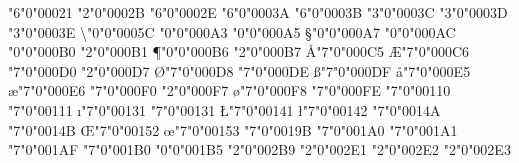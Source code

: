 \ifdefined\Umathchardef
  \let\mchardef\Umathchardef
  \let\delim\Udelimiter
  \let\maccent\Umathaccent
  \let\mcode\Umathcode
  \let\delimcode\Udelcode
  \let\mradical\Uradical
\else
  \let\mchardef\XeTeXmathchardef
  \let\delim\XeTeXdelimiter
  \let\maccent\XeTeXmathaccent
  \let\mcode\XeTeXmathcode
  \let\delimcode\XeTeXdelcode
  \let\mradical\XeTeXradical
\fi

\mchardef\exclam"6"0"00021
\def\lparen{\delim"4"0"00028 }
\def\rparen{\delim"5"0"00029 }
\mchardef\plus"2"0"0002B
\mchardef\ldotp"6"0"0002E
\mchardef\colon"6"0"0003A
\mchardef\semicolon"6"0"0003B
\mchardef\less"3"0"0003C
\mchardef\equal"3"0"0003D
\mchardef\greater"3"0"0003E
\def\lbrack{\delim"4"0"0005B }
\mchardef\backslash"0"0"0005C
\def\rbrack{\delim"5"0"0005D }
\def\lbrace{\delim"4"0"0007B }
\def\vert{\delim"0"0"0007C }
\def\rbrace{\delim"5"0"0007D }
\mchardef\sterling"0"0"000A3
\mchardef\yen"0"0"000A5
\mchardef\S"0"0"000A7
\def\guillemotleft{\delim"4"0"000AB }
\mchardef\neg"0"0"000AC
\mchardef\degree"0"0"000B0
\mchardef\pm"2"0"000B1
\mchardef\P"0"0"000B6
\mchardef\cdotp"2"0"000B7
\def\guillemotright{\delim"5"0"C }
\mchardef\AA"7"0"000C5
\mchardef\AE"7"0"000C6
\mchardef\DH"7"0"000D0
\mchardef\times"2"0"000D7
\mchardef\O"7"0"000D8
\mchardef\TH"7"0"000DE
\mchardef\ss"7"0"000DF
\mchardef\aa"7"0"000E5
\mchardef\ae"7"0"000E6
\mchardef\dh"7"0"000F0
\mchardef\div"2"0"000F7
\mchardef\o"7"0"000F8
\mchardef\th"7"0"000FE
\mchardef\DJ"7"0"00110
\mchardef\dj"7"0"00111
\mchardef\i"7"0"00131
\mchardef\imath"7"0"00131
\mchardef\L"7"0"00141
\mchardef\l"7"0"00142
\mchardef\NG"7"0"0014A
\mchardef\ng"7"0"0014B
\mchardef\OE"7"0"00152
\mchardef\oe"7"0"00153
\mchardef\lambdaslash"7"0"0019B
\mchardef\Ohorn"7"0"001A0
\mchardef\ohorn"7"0"001A1
\mchardef\Uhorn"7"0"001AF
\mchardef\uhorn"7"0"001B0
\mchardef\Zbar"0"0"001B5
\mchardef\cprime"2"0"002B9
\def\^{\maccent"7"0"002C6 }
\def\v{\maccent"7"0"002C7 }
\def\ipacrossaccent{\maccent"7"0"002DF }
\def\ipasupgamma{\maccent"7"0"002E0 }
\mchardef\ipasupl"2"0"002E1
\mchardef\ipasups"2"0"002E2
\mchardef\ipasupx"2"0"002E3
\def\ipasuprerglotstpp{\maccent"7"0"002E4 }
\def\tonebarextrahigh{\maccent"7"0"002E5 }
\def\tonebarhigh{\maccent"7"0"002E6 }
\def\tonebarmid{\maccent"7"0"002E7 }
\def\tonebarlow{\maccent"7"0"002E8 }
\def\tonebarextralow{\maccent"7"0"002E9 }
\def\ipavoicing{\maccent"7"0"002EC }
\def\ipaunaspirated{\maccent"7"0"002ED }
\def\grave{\maccent"7"0"00300 }
\def\acute{\maccent"7"0"00301 }
\def\hat{\maccent"7"0"00302 }
\def\widehat{\maccent"7"0"00302 }
\def\tilde{\maccent"7"0"00303 }
\def\widetilde{\maccent"7"0"00303 }
\def\bar{\maccent"7"0"00304 }
